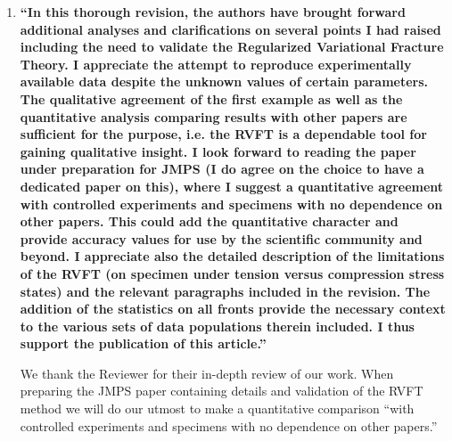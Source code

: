 \documentclass[11pt,letterpaper]{report}
\begin{document}
\begin{enumerate}[label=\textit{1.\arabic*},wide, labelwidth=!, labelindent=0pt]
\item \label{r2c1} {\bf ``In this thorough revision, the authors have brought forward additional analyses and clarifications on several points I had raised including the need to validate the Regularized Variational Fracture Theory. I appreciate the attempt to reproduce experimentally available data despite the unknown values of certain parameters. The qualitative agreement of the first example as well as the quantitative analysis comparing results with other papers are sufficient for the purpose, i.e. the RVFT is a dependable tool for gaining qualitative insight. I look forward to reading the paper under preparation for JMPS (I do agree on the choice to have a dedicated paper on this), where I suggest a quantitative agreement with controlled experiments and specimens with no dependence on other papers. This could add the quantitative character and provide accuracy values for use by the scientific community and beyond.
I appreciate also the detailed description of the limitations of the RVFT (on specimen under tension versus compression stress states) and the relevant paragraphs included in the revision. The addition of the statistics on all fronts provide the necessary context to the various sets of data populations therein included.
I thus support the publication of this article.''}

We thank the Reviewer for their in-depth review of our work. When preparing the JMPS paper containing details and validation of the RVFT method we will do our utmost to make a quantitative comparison ``with controlled experiments and specimens with no dependence on other papers.''





\end{enumerate}
\end{document}
